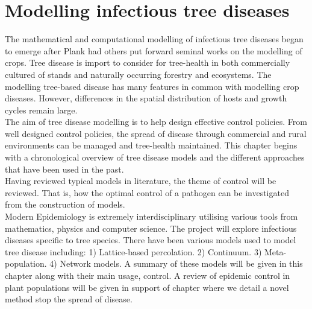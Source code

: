 

\chapter{Modelling infectious tree diseases}
\label{chapter2:litreview} 

The mathematical and computational modelling of infectious tree diseases began to emerge after Plank had others put forward seminal works on the modelling of crops. Tree disease is import to consider for tree-health in both commercially cultured of stands and naturally occurring forestry and ecosystems. The modelling tree-based disease has many features in common with modelling crop diseases. However, differences in the spatial distribution of hosts and growth cycles remain large.\\

The aim of tree disease modelling is to help design effective control policies. From well designed control policies, the spread of disease through commercial and rural environments can be managed and tree-health maintained. This chapter begins with a chronological overview of tree disease models and the different approaches that have been used in the past.\\

Having reviewed typical models in literature, the theme of control will be reviewed. That is, how the optimal control of a pathogen can be investigated from the construction of models.\\

Modern Epidemiology is extremely interdisciplinary utilising various tools from mathematics, physics and computer science. The project will explore infectious diseases specific to tree species. There have been various models used to model tree disease including: 1) Lattice-based percolation. 2) Continuum. 3) Meta-population. 4) Network models. A summary of these models will be given in this chapter along with their main usage, control. A review of epidemic control in plant populations will be given in support of chapter where we detail a novel method stop the spread of disease. 


